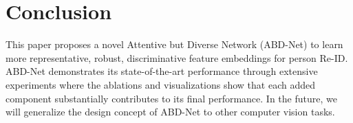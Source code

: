 \documentclass[10pt,twocolumn]{article}
\begin{document}
\section{Conclusion} \label{sec:conclusion}
This paper proposes a novel Attentive but Diverse Network (ABD-Net) to learn more representative, robust, discriminative feature embeddings for person Re-ID.
ABD-Net demonstrates its state-of-the-art performance through extensive experiments where the ablations and visualizations show that each added component substantially contributes to its final performance. In the future, we will generalize the design concept of ABD-Net to other computer vision tasks. 



{\small



}
\end{document}
